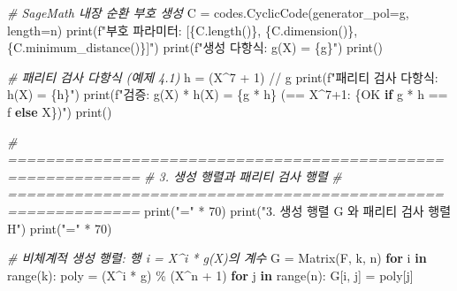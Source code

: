 \documentclass[
  oneside]{article}
\newenvironment{Shaded}{}{}
\newcommand{\BuiltInTok}[1]{\textcolor[rgb]{0.00,0.50,0.00}{#1}}
\newcommand{\CommentTok}[1]{\textcolor[rgb]{0.38,0.63,0.69}{\textit{#1}}}
\newcommand{\ControlFlowTok}[1]{\textcolor[rgb]{0.00,0.44,0.13}{\textbf{#1}}}
\newcommand{\DecValTok}[1]{\textcolor[rgb]{0.25,0.63,0.44}{#1}}
\newcommand{\KeywordTok}[1]{\textcolor[rgb]{0.00,0.44,0.13}{\textbf{#1}}}
\newcommand{\NormalTok}[1]{#1}
\newcommand{\OperatorTok}[1]{\textcolor[rgb]{0.40,0.40,0.40}{#1}}
\newcommand{\SpecialCharTok}[1]{\textcolor[rgb]{0.25,0.44,0.63}{#1}}
\newcommand{\SpecialStringTok}[1]{\textcolor[rgb]{0.73,0.40,0.53}{#1}}
\newcommand{\StringTok}[1]{\textcolor[rgb]{0.25,0.44,0.63}{#1}}
\begin{document}
\begin{Shaded}
\begin{Highlighting}[]
\CommentTok{\# SageMath 내장 순환 부호 생성}
\NormalTok{C }\OperatorTok{=}\NormalTok{ codes.CyclicCode(generator\_pol}\OperatorTok{=}\NormalTok{g, length}\OperatorTok{=}\NormalTok{n)}
\BuiltInTok{print}\NormalTok{(}\SpecialStringTok{f"부호 파라미터: [}\SpecialCharTok{\{}\NormalTok{C}\SpecialCharTok{.}\NormalTok{length()}\SpecialCharTok{\}}\SpecialStringTok{, }\SpecialCharTok{\{}\NormalTok{C}\SpecialCharTok{.}\NormalTok{dimension()}\SpecialCharTok{\}}\SpecialStringTok{, }\SpecialCharTok{\{}\NormalTok{C}\SpecialCharTok{.}\NormalTok{minimum\_distance()}\SpecialCharTok{\}}\SpecialStringTok{]"}\NormalTok{)}
\BuiltInTok{print}\NormalTok{(}\SpecialStringTok{f"생성 다항식: g(X) = }\SpecialCharTok{\{}\NormalTok{g}\SpecialCharTok{\}}\SpecialStringTok{"}\NormalTok{)}
\BuiltInTok{print}\NormalTok{()}

\CommentTok{\# 패리티 검사 다항식 (예제 4.1)}
\NormalTok{h }\OperatorTok{=}\NormalTok{ (X}\OperatorTok{\^{}}\DecValTok{7} \OperatorTok{+} \DecValTok{1}\NormalTok{) }\OperatorTok{//}\NormalTok{ g}
\BuiltInTok{print}\NormalTok{(}\SpecialStringTok{f"패리티 검사 다항식: h(X) = }\SpecialCharTok{\{}\NormalTok{h}\SpecialCharTok{\}}\SpecialStringTok{"}\NormalTok{)}
\BuiltInTok{print}\NormalTok{(}\SpecialStringTok{f"검증: g(X) * h(X) = }\SpecialCharTok{\{}\NormalTok{g }\OperatorTok{*}\NormalTok{ h}\SpecialCharTok{\}}\SpecialStringTok{  (== X\^{}7+1: }\SpecialCharTok{\{}\StringTok{\textquotesingle{}OK\textquotesingle{}} \ControlFlowTok{if}\NormalTok{ g }\OperatorTok{*}\NormalTok{ h }\OperatorTok{==}\NormalTok{ f }\ControlFlowTok{else} \StringTok{\textquotesingle{}X\textquotesingle{}}\SpecialCharTok{\}}\SpecialStringTok{)"}\NormalTok{)}
\BuiltInTok{print}\NormalTok{()}

\CommentTok{\# ============================================================}
\CommentTok{\# 3. 생성 행렬과 패리티 검사 행렬}
\CommentTok{\# ============================================================}
\BuiltInTok{print}\NormalTok{(}\StringTok{"="} \OperatorTok{*} \DecValTok{70}\NormalTok{)}
\BuiltInTok{print}\NormalTok{(}\StringTok{"3. 생성 행렬 G 와 패리티 검사 행렬 H"}\NormalTok{)}
\BuiltInTok{print}\NormalTok{(}\StringTok{"="} \OperatorTok{*} \DecValTok{70}\NormalTok{)}

\CommentTok{\# 비체계적 생성 행렬: 행 i = X\^{}i * g(X)의 계수}
\NormalTok{G }\OperatorTok{=}\NormalTok{ Matrix(F, k, n)}
\ControlFlowTok{for}\NormalTok{ i }\KeywordTok{in} \BuiltInTok{range}\NormalTok{(k):}
\NormalTok{    poly }\OperatorTok{=}\NormalTok{ (X}\OperatorTok{\^{}}\NormalTok{i }\OperatorTok{*}\NormalTok{ g) }\OperatorTok{\%}\NormalTok{ (X}\OperatorTok{\^{}}\NormalTok{n }\OperatorTok{+} \DecValTok{1}\NormalTok{)}
    \ControlFlowTok{for}\NormalTok{ j }\KeywordTok{in} \BuiltInTok{range}\NormalTok{(n):}
\NormalTok{        G[i, j] }\OperatorTok{=}\NormalTok{ poly[j]}


\end{Highlighting}
\end{Shaded}
\end{document}
